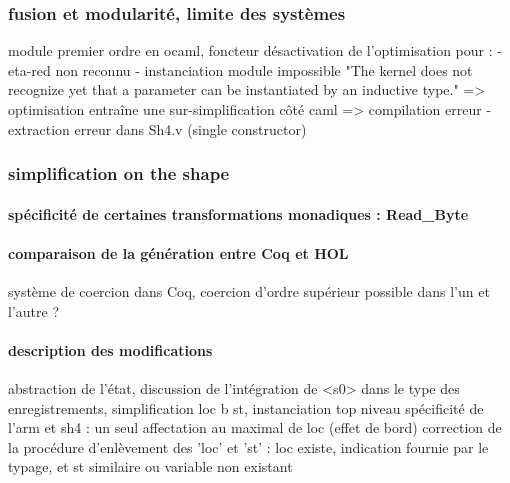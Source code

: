 \documentclass[a4paper, 11pt]{article}
\begin{document}
    \subsubsection{fusion et modularité, limite des systèmes}
    module premier ordre en ocaml, foncteur
    désactivation de l'optimisation pour :
      - eta-red non reconnu
      - instanciation module impossible "The kernel does not recognize yet that a parameter can be instantiated by an inductive type." => optimisation entraîne une sur-simplification côté caml => compilation erreur 
      - extraction erreur dans Sh4.v (single constructor)
      
    \subsubsection{simplification on the shape}
      \paragraph{spécificité de certaines transformations monadiques : Read\_Byte}
      \paragraph{comparaison de la génération entre Coq et HOL}
      \cite{conf/itp/FoxM10}
      système de coercion dans Coq, coercion d'ordre supérieur possible dans l'un et l'autre ?
      \paragraph{description des modifications}
      abstraction de l'état, 
      discussion de l'intégration de <s0> dans le type des enregistrements,
      simplification {loc b st}, instanciation top niveau
      spécificité de l'arm et sh4 : un seul affectation au maximal de loc (effet de bord)
      correction de la procédure d'enlèvement des 'loc' et 'st' : loc existe, indication fournie par le typage, et st similaire ou variable non existant
\end{document}
